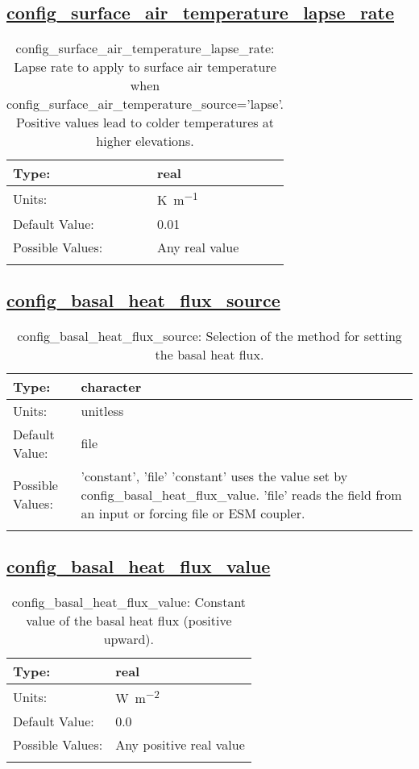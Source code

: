 \subsection[config\_surface\_air\_temperature\_lapse\_rate]{\hyperref[sec:nm_tab_thermal_solver]{config\_surface\_air\_temperature\_lapse\_rate}}
\label{subsec:nm_sec_config_surface_air_temperature_lapse_rate}
\begin{center}
\begin{longtable}{| p{2.0in} || p{4.0in} |}
    \hline
    Type: & real \\
    \hline
    Units: & \si{K.m^{-1}} \\
    \hline
    Default Value: & 0.01 \\
    \hline
    Possible Values: & Any real value \\
    \hline
    \caption{config\_surface\_air\_temperature\_lapse\_rate: Lapse rate to apply to surface air temperature when config\_surface\_air\_temperature\_source='lapse'. Positive values lead to colder temperatures at higher elevations.}
\end{longtable}
\end{center}
\subsection[config\_basal\_heat\_flux\_source]{\hyperref[sec:nm_tab_thermal_solver]{config\_basal\_heat\_flux\_source}}
\label{subsec:nm_sec_config_basal_heat_flux_source}
\begin{center}
\begin{longtable}{| p{2.0in} || p{4.0in} |}
    \hline
    Type: & character \\
    \hline
    Units: & \si{unitless} \\
    \hline
    Default Value: & file \\
    \hline
    Possible Values: & 'constant', 'file'  'constant' uses the value set by config\_basal\_heat\_flux\_value.  'file' reads the field from an input or forcing file or ESM coupler. \\
    \hline
    \caption{config\_basal\_heat\_flux\_source: Selection of the method for setting the basal heat flux.}
\end{longtable}
\end{center}
\subsection[config\_basal\_heat\_flux\_value]{\hyperref[sec:nm_tab_thermal_solver]{config\_basal\_heat\_flux\_value}}
\label{subsec:nm_sec_config_basal_heat_flux_value}
\begin{center}
\begin{longtable}{| p{2.0in} || p{4.0in} |}
    \hline
    Type: & real \\
    \hline
    Units: & \si{W.m^{-2}} \\
    \hline
    Default Value: & 0.0 \\
    \hline
    Possible Values: & Any positive real value \\
    \hline
    \caption{config\_basal\_heat\_flux\_value: Constant value of the basal heat flux (positive upward).}
\end{longtable}
\end{center}
